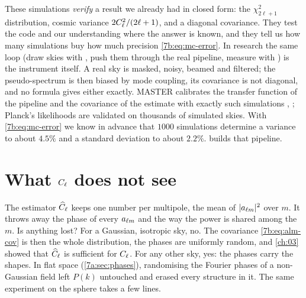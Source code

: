 \begin{inpractice}
These simulations \emph{verify} a result we already had in closed form: the
$\chi^2_{2\ell+1}$ distribution, cosmic variance $2C_\ell^2/(2\ell+1)$, and a diagonal covariance.
They test the code and our understanding where the answer is known, and they tell us how many
simulations buy how much precision \eqref{7b:eq:mc-error}.
In research the same loop (draw skies with , push them through the real
pipeline, measure with ) is the instrument itself. A real sky is masked, noisy,
beamed and filtered; the pseudo-spectrum is then biased by mode coupling, its covariance is not
diagonal, and no formula gives either exactly. MASTER calibrates the transfer function of the
pipeline and the covariance of the estimate with exactly such simulations ,
\cite{Hivon2002}; Planck's likelihoods are validated on thousands of simulated skies. With
\eqref{7b:eq:mc-error} we know in advance that $1000$ simulations determine a variance to about
$4.5\%$ and a standard deviation to about $2.2\%$.  builds that pipeline.
\end{inpractice}
\section{What $C_\ell$ does not see}
\label{7b:sec:what-cl-misses}

The estimator $\widehat{C}_\ell$ keeps one number per multipole, the mean of $|a_{\ell m}|^2$ over $m$. It throws
away the phase of every $a_{\ell m}$ and the way the power is shared among the $m$. Is anything lost?
For a Gaussian, isotropic sky, no. The covariance \eqref{7b:eq:alm-cov} is then the whole
distribution, the phases are uniformly random, and \cref{ch:03} showed that $\widehat{C}_\ell$ is
sufficient for $C_\ell$. For any other sky, yes: the phases carry the shapes. In flat space
(\cref{7a:sec:phases}), randomising the Fourier phases of a non-Gaussian field left $P(k)$
untouched and erased every structure in it. The same experiment on the sphere takes a few lines.

